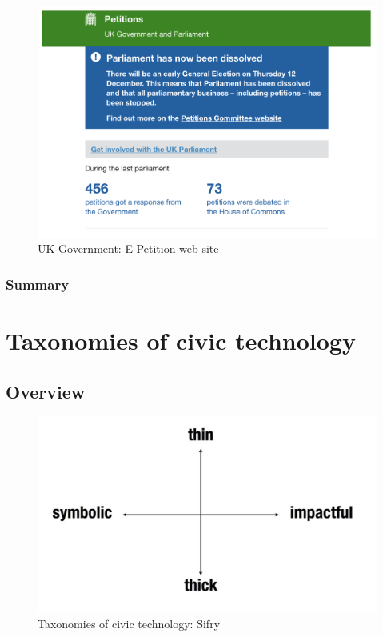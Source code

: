 \documentclass{article}
\begin{document}
			\begin{figure}
				\centering
				\includegraphics[scale=0.4]{images/e-petition-site}
				\caption{UK Government: E-Petition web site}
				\label{fig:e-petition-site}
			\end{figure}
						
        	\subsubsection*{Summary}
        	
        	
        	 
\section*{Taxonomies of civic technology}

        \subsection*{Overview}
        
        
			\begin{figure}
				\centering
				\includegraphics[scale=0.5]{images/taxonomy-sifry}
				\caption{Taxonomies of civic technology: Sifry}
				\label{fig:taxonomy-sifry}
			\end{figure}
			        
\end{document}
